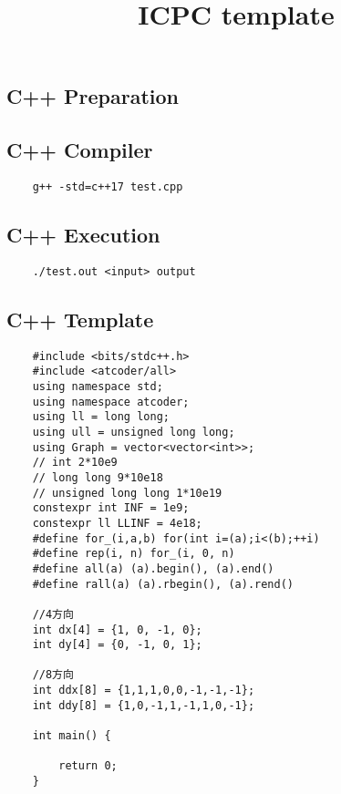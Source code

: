 \documentclass[a4paper, landscape, 9pt]{jarticle} %
\title{\vspace{-4ex}\huge{ICPC template}} %
\author{} %
\date{} %
\begin{document}
\begin{multicols*}{3} %
    \maketitle
    \vspace{-25mm}
    \tableofcontents

    \newpage

    \section{C++ Preparation}
    \subsection{C++ Compiler}
    \begin{lstlisting}
    g++ -std=c++17 test.cpp
    \end{lstlisting}

    \subsection{C++ Execution}
    \begin{lstlisting}
    ./test.out <input> output
    \end{lstlisting}

    \subsection{C++ Template}
    \begin{lstlisting}
    #include <bits/stdc++.h>
    #include <atcoder/all>
    using namespace std;
    using namespace atcoder;
    using ll = long long;
    using ull = unsigned long long;
    using Graph = vector<vector<int>>;
    // int 2*10e9
    // long long 9*10e18
    // unsigned long long 1*10e19
    constexpr int INF = 1e9;
    constexpr ll LLINF = 4e18;
    #define for_(i,a,b) for(int i=(a);i<(b);++i)
    #define rep(i, n) for_(i, 0, n)
    #define all(a) (a).begin(), (a).end()
    #define rall(a) (a).rbegin(), (a).rend()

    //4方向
    int dx[4] = {1, 0, -1, 0};
    int dy[4] = {0, -1, 0, 1};

    //8方向
    int ddx[8] = {1,1,1,0,0,-1,-1,-1}; 
    int ddy[8] = {1,0,-1,1,-1,1,0,-1};

    int main() {
        
        return 0;
    }
    \end{lstlisting}


\end{multicols*}
\end{document}
